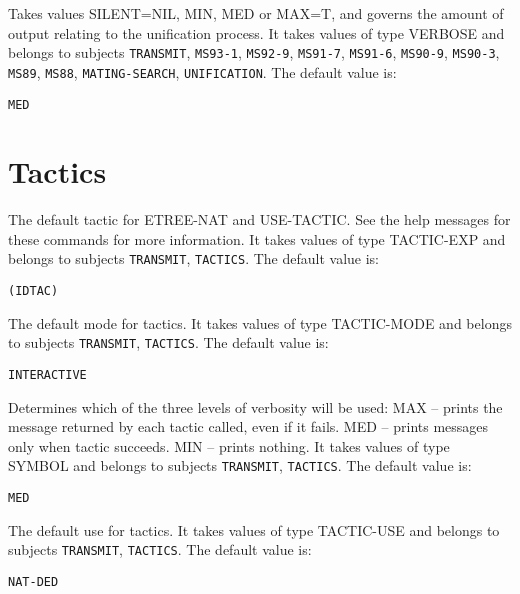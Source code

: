 \begin{description}
\item[UNIFY-VERBOSE]  
Takes values SILENT=NIL, MIN, MED or MAX=T, and governs the amount
of output relating to the unification process.
It takes values of type VERBOSE and belongs to subjects \texttt{TRANSMIT}, \texttt{MS93-1}, \texttt{MS92-9}, \texttt{MS91-7}, \texttt{MS91-6}, \texttt{MS90-9}, \texttt{MS90-3}, \texttt{MS89}, \texttt{MS88}, \texttt{MATING-SEARCH}, \texttt{UNIFICATION}.  The default value is: \begin{lstlisting}
MED
\end{lstlisting}

\item
\end{description}

\section{Tactics}

\begin{description} 
\item[DEFAULT-TACTIC]  
The default tactic for ETREE-NAT and USE-TACTIC.
See the help messages for these commands for more information.
It takes values of type TACTIC-EXP and belongs to subjects \texttt{TRANSMIT}, \texttt{TACTICS}.  The default value is: \begin{lstlisting}
(IDTAC)
\end{lstlisting}

\item[TACMODE]  
The default mode for tactics. 
It takes values of type TACTIC-MODE and belongs to subjects \texttt{TRANSMIT}, \texttt{TACTICS}.  The default value is: \begin{lstlisting}
INTERACTIVE
\end{lstlisting}

\item[TACTIC-VERBOSE]  
Determines which of the three levels of verbosity will be used:
MAX -- prints the message returned by each tactic called, even if it fails.
MED -- prints messages only when tactic succeeds.
MIN -- prints nothing.
It takes values of type SYMBOL and belongs to subjects \texttt{TRANSMIT}, \texttt{TACTICS}.  The default value is: \begin{lstlisting}
MED
\end{lstlisting}

\item[TACUSE]  
The default use for tactics. 
It takes values of type TACTIC-USE and belongs to subjects \texttt{TRANSMIT}, \texttt{TACTICS}.  The default value is: \begin{lstlisting}
NAT-DED
\end{lstlisting}

\item
\end{description}

